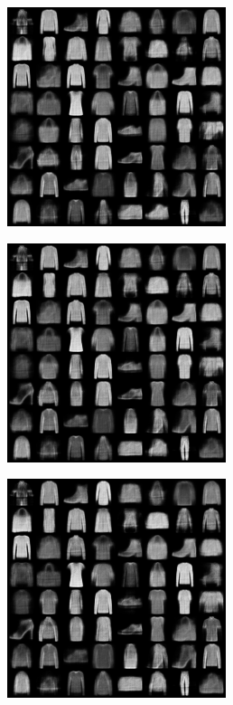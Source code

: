 \begin{figure}[htbp]
\begin{subfigure}
        \label{fig:vae_0.4}
    \end{subfigure}
    \begin{subfigure}
        \centering
        \includegraphics[width=0.32\linewidth]{../images/vae-0.50-merge.png}
        \label{fig:vae_0.5}
    \end{subfigure}
    \begin{subfigure}
        \centering
        \includegraphics[width=0.32\linewidth]{../images/vae-0.60-merge.png}
        \label{fig:vae_0.6}
    \end{subfigure}
    \begin{subfigure}
        \centering
        \includegraphics[width=0.32\linewidth]{../images/vae-0.70-merge.png}
        \label{fig:vae_0.7}
    \end{subfigure}

\end{figure}
